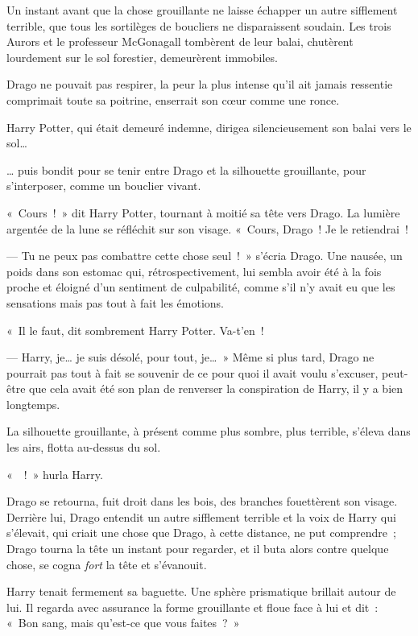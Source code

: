 \begin{em}
Un instant avant que la chose grouillante ne laisse échapper un autre sifflement terrible, que tous les sortilèges de boucliers ne disparaissent soudain. Les trois Aurors et le professeur McGonagall tombèrent de leur balai, chutèrent lourdement sur le sol forestier, demeurèrent immobiles.

Drago ne pouvait pas respirer, la peur la plus intense qu'il ait jamais ressentie comprimait toute sa poitrine, enserrait son cœur comme une ronce.

Harry Potter, qui était demeuré indemne, dirigea silencieusement son balai vers le sol…

… puis bondit pour se tenir entre Drago et la silhouette grouillante, pour s'interposer, comme un bouclier vivant.

«~Cours~!~» dit Harry Potter, tournant à moitié sa tête vers Drago. La lumière argentée de la lune se réfléchit sur son visage. «~Cours, Drago~! Je le retiendrai~!

--- Tu ne peux pas combattre cette chose seul~!~» s'écria Drago. Une nausée, un poids dans son estomac qui, rétrospectivement, lui sembla avoir été à la fois proche et éloigné d'un sentiment de culpabilité, comme s'il n'y avait eu que les sensations mais pas tout à fait les émotions.

«~Il le faut, dit sombrement Harry Potter. Va-t'en~!

--- Harry, je… je suis désolé, pour tout, je…~» Même si plus tard, Drago ne pourrait pas tout à fait se souvenir de ce pour quoi il avait voulu s'excuser, peut-être que cela avait été son plan de renverser la conspiration de Harry, il y a bien longtemps.

La silhouette grouillante, à présent comme plus sombre, plus terrible, s'éleva dans les airs, flotta au-dessus du sol.

«~~!~» hurla Harry.

Drago se retourna, fuit droit dans les bois, des branches fouettèrent son visage. Derrière lui, Drago entendit un autre sifflement terrible et la voix de Harry qui s'élevait, qui criait une chose que Drago, à cette distance, ne put comprendre~; Drago tourna la tête un instant pour regarder, et il buta alors contre quelque chose, se cogna \emph{fort} la tête et s'évanouit.
\end{em}

\later

Harry tenait fermement sa baguette. Une sphère prismatique brillait autour de lui. Il regarda avec assurance la forme grouillante et floue face à lui et dit~: «~Bon sang, mais qu'est-ce que vous faites~?~»

